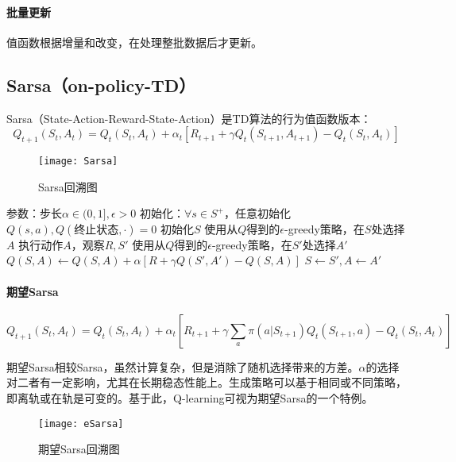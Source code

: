 \documentclass[
12pt, %
a4paper, 
oneside, %
headinclude,footinclude, %
]{scrartcl}
\begin{document}
\paragraph{批量更新}
值函数根据增量和改变，在处理整批数据后才更新。
\subsection[Sarsa]{Sarsa（on-policy-TD）}
Sarsa（State-Action-Reward-State-Action）是TD算法的行为值函数版本：
$$ Q_{t + 1}(S_t, A_t) = Q_t(S_t, A_t) + \alpha_t[R_{t + 1} + \gamma Q_t(S_{t + 1}, A_{t + 1}) - Q_t(S_t, A_t)] $$

\begin{figure}[H]
\centering
\texttt{[image: Sarsa]}
\caption[Sarsa回溯图]{Sarsa回溯图}
\end{figure}
\begin{myalgorithm}
\State 参数：步长$ \alpha \in (0,1], \epsilon > 0 $
\State 初始化：$ \forall s \in S^+ $，任意初始化$ Q(s,a), Q(\text{终止状态}, \cdot) = 0 $
\State 初始化$ S $
\State 使用从$ Q $得到的$ \epsilon $-greedy策略，在$ S $处选择$ A $
\State 执行动作$ A $，观察$ R,S' $
\State 使用从$ Q $得到的$ \epsilon$-greedy策略，在$ S' $处选择$ A' $
\State $ Q(S, A) \gets Q(S, A) + \alpha [R + \gamma Q(S', A') - Q(S, A)] $
\State $ S \gets S', A \gets A' $
\EndWhile
\EndFor
\end{myalgorithm}
\paragraph{期望Sarsa}
$$ Q_{t + 1}(S_t, A_t) = Q_t(S_t, A_t) + \alpha_t[R_{t + 1} + \gamma \sum_a \pi(a|S_{t + 1}) Q_t(S_{t + 1}, a) - Q_t(S_t, A_t)] $$

\begin{minipage}{0.6\textwidth}
\hspace{2em}
期望Sarsa相较Sarsa，虽然计算复杂，但是消除了随机选择带来的方差。$ \alpha $的选择对二者有一定影响，尤其在长期稳态性能上。生成策略可以基于相同或不同策略，即离轨或在轨是可变的。基于此，Q-learning可视为期望Sarsa的一个特例。
\end{minipage}
\hfill
\begin{minipage}{0.35\textwidth}
\begin{figure}[H]
\centering
\texttt{[image: eSarsa]}
\caption[期望Sarsa回溯图]{期望Sarsa回溯图}
\end{figure}
\end{minipage}
\end{document}
